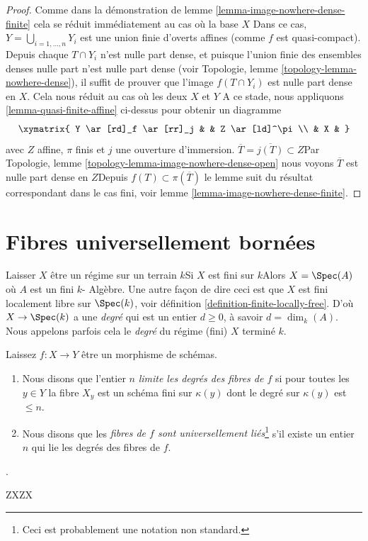 \begin{proof}

Comme dans la démonstration de lemme \ref{lemma-image-nowhere-dense-finite} cela se réduit immédiatement au cas où la base $X$ Dans ce cas, $Y = \bigcup_{i = 1, \ldots, n} Y_i$ est une union finie d'overts affines (comme $f$ est quasi-compact). Depuis chaque $T \cap Y_i$
n'est nulle part dense, et puisque l'union finie des ensembles denses nulle part n'est nulle part dense (voir Topologie, lemme \ref{topology-lemma-nowhere-dense}), il suffit de prouver que l'image $f(T \cap Y_i)$ est nulle part dense en $X$. Cela nous réduit au cas où les deux $X$ et $Y$ A ce stade, nous appliquons \ref{lemma-quasi-finite-affine} ci-dessus pour obtenir un diagramme
$$
\xymatrix{
Y \ar[rd]_f \ar[rr]_j & & Z \ar[ld]^\pi \\
& X &
}
$$
avec $Z$ affine, $\pi$ finis et $j$ une ouverture d'immersion. $\overline{T} = \overline{j(T)} \subset Z$Par Topologie, lemme \ref{topology-lemma-image-nowhere-dense-open}
nous voyons $\overline{T}$ est nulle part dense en $Z$Depuis $f(T) \subset \pi(\overline{T})$
le lemme suit du résultat correspondant dans le cas fini, voir lemme \ref{lemma-image-nowhere-dense-finite}.

\end{proof}




\section{Fibres universellement bornées}
\label{section-universally-bounded}

\noindent

Laisser $X$ être un régime sur un terrain $k$Si $X$ est fini sur $k$Alors $X = \Spec(A)$ où $A$ est un fini $k$- Algèbre. Une autre façon de dire ceci est que $X$ est fini localement libre sur $\Spec(k)$, voir définition \ref{definition-finite-locally-free}. D'où
$X \to \Spec(k)$ a une {\it degré} qui est un entier $d \geq 0$, à savoir $d = \dim_k(A)$. Nous appelons parfois cela le {\it degré} du régime (fini) $X$ terminé $k$.

\begin{definition}

\label{definition-universally-bounded}
Laissez $f : X \to Y$ être un morphisme de schémas.
\begin{enumerate}
\item Nous disons que l'entier $n$ {\it limite les degrés des fibres de $f$} si pour toutes les $y \in Y$ la fibre $X_y$ est un schéma fini sur $\kappa(y)$ dont le degré sur $\kappa(y)$ est $\leq n$.
\item Nous disons que les {\it fibres de $f$ sont universellement liés}\footnote{Ceci est probablement une notation non standard.} s'il existe un entier $n$ qui lie les degrés des fibres de $f$.
\end{enumerate}
.
\end{definition}
ZXZX

